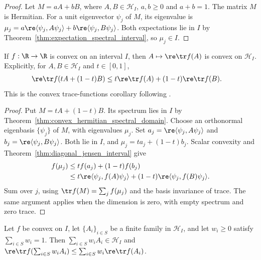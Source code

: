 \begin{proof}\leanok
    Let $M=aA+bB$, where $A,B\in\mathcal H_I$, $a,b\ge0$ and $a+b=1$.
    The matrix $M$ is Hermitian. For a unit eigenvector $\psi_j$ of $M$,
    its eigenvalue is
    $\mu_j=a\re\langle\psi_j,A\psi_j\rangle+
    b\re\langle\psi_j,B\psi_j\rangle$.
    Both expectations lie in $I$ by
    Theorem~\ref{thm:expectation_spectral_interval}, so $\mu_j\in I$.
\end{proof}

\begin{theorem}\label{thm:trace_convex_functions_interval}
    \leanok
    If $f:\R\to\R$ is convex on an interval $I$, then
    $A\mapsto\re\tr f(A)$ is convex on $\mathcal H_I$. Explicitly, for
    $A,B\in\mathcal H_I$ and $t\in[0,1]$,
    \begin{align}
        \re\tr f(tA+(1-t)B)
        &\le t\re\tr f(A)+(1-t)\re\tr f(B).
        \notag
    \end{align}
    This is the convex trace-functions corollary following
    \cite[Theorem~5.17]{Wolf2012Quantum}.
\end{theorem}

\begin{proof}\leanok
    Put $M=tA+(1-t)B$. Its spectrum lies in $I$ by
    Theorem~\ref{thm:convex_hermitian_spectral_domain}.
    Choose an orthonormal eigenbasis $\{\psi_j\}$ of $M$, with eigenvalues
    $\mu_j$. Set $a_j=\re\langle\psi_j,A\psi_j\rangle$ and
    $b_j=\re\langle\psi_j,B\psi_j\rangle$. Both lie in $I$, and
    $\mu_j=ta_j+(1-t)b_j$. Scalar convexity and
    Theorem~\ref{thm:diagonal_jensen_interval} give
    \begin{align}
        f(\mu_j)
        &\le t f(a_j)+(1-t)f(b_j) \notag\\
        &\le t\re\langle\psi_j,f(A)\psi_j\rangle
          +(1-t)\re\langle\psi_j,f(B)\psi_j\rangle.
        \notag
    \end{align}
    Sum over $j$, using $\tr f(M)=\sum_j f(\mu_j)$ and the basis invariance
    of trace. The same argument applies when the dimension is zero, with
    empty spectrum and zero trace.
\end{proof}

\begin{theorem}%
    \label{thm:trace_convex_functions_finite}
    \leanok
    Let $f$ be convex on $I$, let $\{A_i\}_{i\in S}$ be a finite family in
    $\mathcal H_I$, and let $w_i\ge0$ satisfy $\sum_{i\in S}w_i=1$.
    Then $\sum_{i\in S}w_iA_i\in\mathcal H_I$ and
    $\re\tr f(\sum_{i\in S}w_iA_i)\le\sum_{i\in S}w_i\re\tr f(A_i)$.
\end{theorem}

